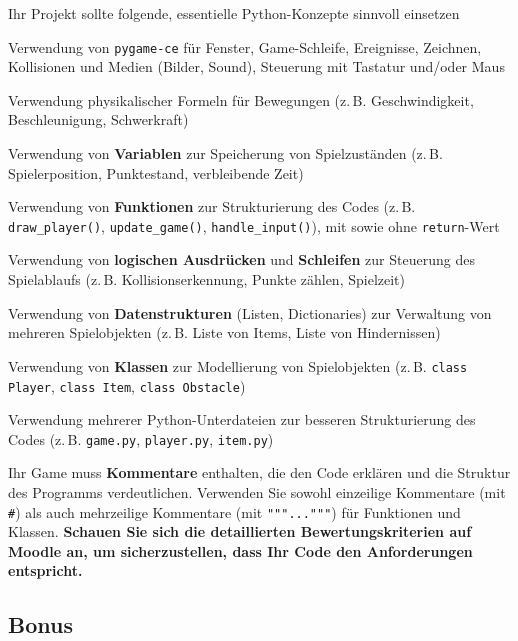Ihr Projekt sollte folgende, essentielle Python-Konzepte sinnvoll einsetzen
\begin{todolist}
    \item Verwendung von \texttt{pygame-ce} für Fenster, Game-Schleife, Ereignisse, Zeichnen, Kollisionen und Medien (Bilder, Sound), Steuerung mit Tastatur und/oder Maus
    \item Verwendung physikalischer Formeln für Bewegungen (z.\,B. Geschwindigkeit, Beschleunigung, Schwerkraft)
    \item Verwendung von \textbf{Variablen} zur Speicherung von Spielzuständen (z.\,B. Spielerposition, Punktestand, verbleibende Zeit)
    \item Verwendung von \textbf{Funktionen} zur Strukturierung des Codes (z.\,B. \lstinline|draw_player()|, \lstinline|update_game()|, \lstinline|handle_input()|), mit sowie ohne \lstinline|return|-Wert
    \item Verwendung von \textbf{logischen Ausdrücken} und \textbf{Schleifen} zur Steuerung des Spielablaufs (z.\,B. Kollisionserkennung, Punkte zählen, Spielzeit)
    \item Verwendung von \textbf{Datenstrukturen} (Listen, Dictionaries) zur Verwaltung von mehreren Spielobjekten (z.\,B. Liste von Items, Liste von Hindernissen)
    \item Verwendung von \textbf{Klassen} zur Modellierung von Spielobjekten (z.\,B. \lstinline|class Player|, \lstinline|class Item|, \lstinline|class Obstacle|)
    \item Verwendung mehrerer Python-Unterdateien zur besseren Strukturierung des Codes (z.\,B. \lstinline|game.py|, \lstinline|player.py|, \lstinline|item.py|)
\end{todolist}

Ihr Game muss \textbf{Kommentare} enthalten, die den Code erklären und die Struktur des Programms verdeutlichen. Verwenden Sie sowohl einzeilige Kommentare (mit \lstinline|#|) als auch mehrzeilige Kommentare (mit \texttt{"""..."""}) für Funktionen und Klassen. \textbf{Schauen Sie sich die detaillierten Bewertungskriterien auf Moodle an, um sicherzustellen, dass Ihr Code den Anforderungen entspricht.}

\subsection{Bonus}


